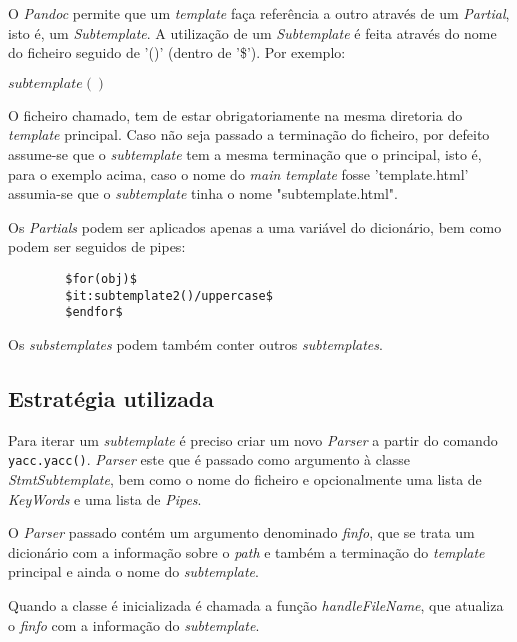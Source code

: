 \documentclass[../relatorio.tex]{subfiles}
\begin{document}
    O \textit{Pandoc} permite que um \textit{template} faça referência a outro
    através de um \textit{Partial}, isto é, um \textit{Subtemplate}. A utilização
    de um \textit{Subtemplate} é feita através do nome do ficheiro seguido de '()'
    (dentro de '\$'). Por exemplo:

    \texttt{$subtemplate()$}

    O ficheiro chamado, tem de estar obrigatoriamente na mesma diretoria do \textit{template}
    principal. Caso não seja passado a terminação do ficheiro, por defeito assume-se que o
    \textit{subtemplate} tem a mesma terminação que o principal, isto é, para o exemplo acima, caso o nome do
    \textit{main template} fosse 'template.html' assumia-se que o \textit{subtemplate} tinha o nome "subtemplate.html".
    
    Os \textit{Partials} podem ser aplicados apenas a uma variável do dicionário, bem como podem ser seguidos de pipes:

    \begin{verbatim}
        $for(obj)$
        $it:subtemplate2()/uppercase$
        $endfor$
    \end{verbatim}

    Os \textit{substemplates} podem também conter outros \textit{subtemplates}.

    \subsection*{Estratégia utilizada}

    Para iterar um \textit{subtemplate} é preciso criar um novo \textit{Parser} a partir do
    comando \texttt{yacc.yacc()}. \textit{Parser} este que é passado como argumento
    à classe \textit{StmtSubtemplate}, bem como o nome do ficheiro e opcionalmente uma lista
    de \textit{KeyWords} e uma lista de \textit{Pipes}. 
    
    O \textit{Parser} passado contém um argumento denominado \textit{finfo}, que se trata um dicionário com a informação
    sobre o \textit{path} e também a terminação do \textit{template} principal e ainda o nome do \textit{subtemplate}. 

    Quando a classe é inicializada é chamada a função \textit{handleFileName}, que atualiza o \textit{finfo} com a 
    informação do \textit{subtemplate}.

    \inputminted[firstline=14, lastline=21]{py}{../modules/Stmt/StmtSubtemplate.py}
\end{document}
